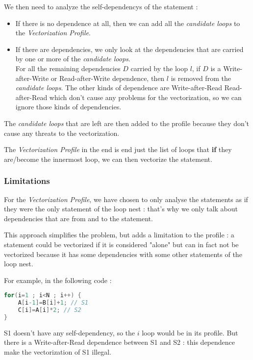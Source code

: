 \documentclass[paper=a4, fontsize=11.5pt]{scrartcl}
\numberwithin{equation}{section}        %
\numberwithin{figure}{section}          %
\numberwithin{table}{section}               %
\begin{document}
        \bigskip

        We then need to analyze the \glspl{self-dependency} of the statement :
        \begin{itemize}
            \item If there is no dependence at all, then we can add all the 
                \textit{candidate loops} to the \textit{Vectorization Profile}.
            \item If there are dependencies, we only look at the dependencies that
                are carried by one or more of the \textit{candidate loops}.\\
                For all the remaining dependencies $D$ carried by the loop $l$,
                if $D$ is a Write-after-Write or Read-after-Write dependence, then $l$
                is removed from the \textit{candidate loops}.
                The other kinds of dependence are Write-after-Read Read-after-Read 
                which don't cause any problems for the vectorization, so we can ignore
                those kinds of dependencies.
        \end{itemize}
        The \textit{candidate loops} that are left are then added to the profile because they
        don't cause any threats to the vectorization.

        \bigskip

        The \textit{Vectorization Profile} in the end is end just the list of loops that
        \textbf{if} they are/become the innermost loop, we can then vectorize the statement.

        \subsubsection{Limitations}
        For the \textit{Vectorization Profile}, we have chosen to only analyse the statements
        as if they were the only statement of the loop nest : that's why we only talk
        about dependencies that are from and to the statement.

        This approach simplifies the problem, but adds a limitation to the profile :
        a statement could be vectorized if it is considered "alone" but can in fact not
        be vectorized because it has some dependencies with some other statements of the loop
        nest.

        For example, in the following code :
\begin{lstlisting}[frame=single, language=C, caption={Vectorization Profile Limitation Example}, label={lst:vectorization_limitation}]
for(i=1 ; i<N ; i++) {
    A[i-1]=B[i]+1; // S1
    C[i]=A[i]*2; // S2
}
\end{lstlisting}
    S1 doesn't have any \gls{self-dependency}, so the $i$ loop would be in its
    profile. But there is a Write-after-Read dependence between S1 and S2 : this dependence
    make the vectorization of S1 illegal.
\end{document}
